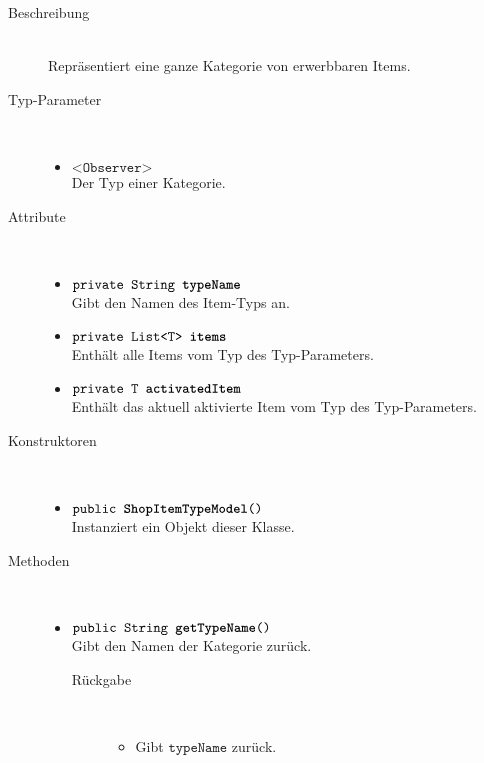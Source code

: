 \begin{description}
\item[Beschreibung] \hfill \\ Repräsentiert eine ganze Kategorie von erwerbbaren Items.

\item[Typ-Parameter] \hfill \\
	\vspace{-.8cm}
	\begin{itemize}
		\item $\texttt{<Observer>}$ \\ Der Typ einer Kategorie.
	\end{itemize}

\item[Attribute] \hfill \\
	\vspace{-.8cm}
	\begin{itemize}
		\item $\texttt{private String \textbf{typeName}}$ \\ Gibt den Namen des Item-Typs an.
		\item $\texttt{private List<T> \textbf{items}}$ \\ Enthält alle Items vom Typ des Typ-Parameters.
		\item $\texttt{private T \textbf{activatedItem}}$ \\ Enthält das aktuell aktivierte Item vom Typ des Typ-Parameters.
		\end{itemize}
	
\item[Konstruktoren] \hfill \\
	\vspace{-.8cm}
	\begin{itemize}
		\item $\texttt{public \textbf{ShopItemTypeModel}()}$ \\ Instanziert ein Objekt dieser Klasse.

	\end{itemize}
	
\item[Methoden] \hfill \\
	\vspace{-.8cm}
	\begin{itemize}
		\item $\texttt{public String \textbf{getTypeName}()}$ \\ Gibt den Namen der Kategorie zurück.
		\begin{description}
			\item[Rückgabe] \hfill \\
			\vspace{-.8cm}
			\begin{itemize}
				\item Gibt $\texttt{typeName}$ zurück.
			\end{itemize}
			\end{description}
		

\end{itemize}
\end{description}
